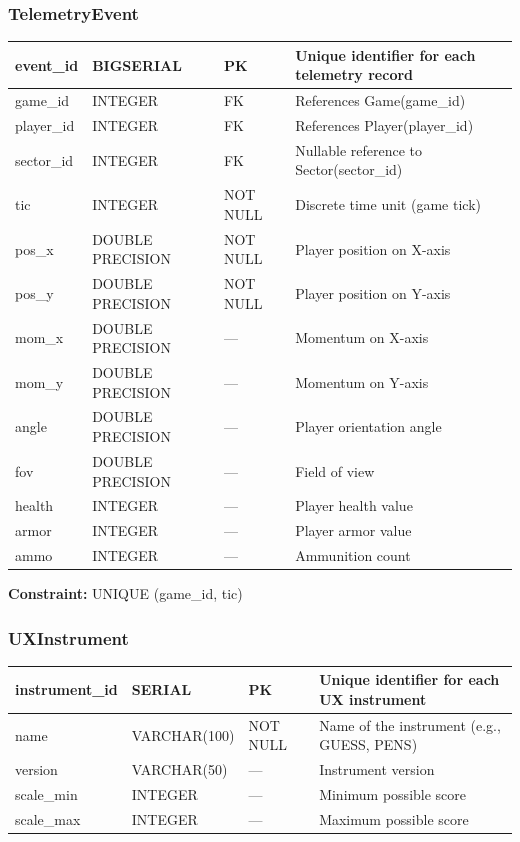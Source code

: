 \documentclass[11pt]{article}
\begin{document}
\subsubsection*{TelemetryEvent}
\begin{tabularx}{\linewidth}{|l|l|l|X|}
\hline
event\_id & BIGSERIAL & PK & Unique identifier for each telemetry record \\
\hline
game\_id & INTEGER & FK & References Game(game\_id) \\
\hline
player\_id & INTEGER & FK & References Player(player\_id) \\
\hline
sector\_id & INTEGER & FK & Nullable reference to Sector(sector\_id) \\
\hline
tic & INTEGER & NOT NULL & Discrete time unit (game tick) \\
\hline
pos\_x & DOUBLE PRECISION & NOT NULL & Player position on X-axis \\
\hline
pos\_y & DOUBLE PRECISION & NOT NULL & Player position on Y-axis \\
\hline
mom\_x & DOUBLE PRECISION & --- & Momentum on X-axis \\
\hline
mom\_y & DOUBLE PRECISION & --- & Momentum on Y-axis \\
\hline
angle & DOUBLE PRECISION & --- & Player orientation angle \\
\hline
fov & DOUBLE PRECISION & --- & Field of view \\
\hline
health & INTEGER & --- & Player health value \\
\hline
armor & INTEGER & --- & Player armor value \\
\hline
ammo & INTEGER & --- & Ammunition count \\
\hline
\end{tabularx}

\textbf{Constraint:} UNIQUE (game\_id, tic)

\subsubsection*{UXInstrument}
\begin{tabularx}{\linewidth}{|l|l|l|X|}
\hline
instrument\_id & SERIAL & PK & Unique identifier for each UX instrument \\
\hline
name & VARCHAR(100) & NOT NULL & Name of the instrument (e.g., GUESS, PENS) \\
\hline
version & VARCHAR(50) & --- & Instrument version \\
\hline
scale\_min & INTEGER & --- & Minimum possible score \\
\hline
scale\_max & INTEGER & --- & Maximum possible score \\
\hline
\end{tabularx}
\end{document}

